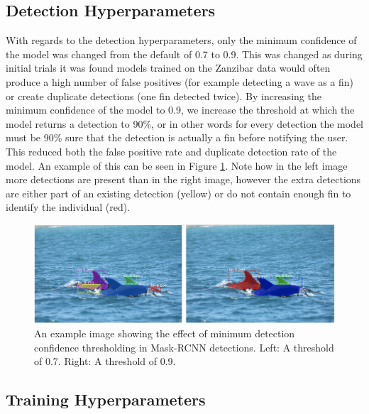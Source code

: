 \subsection{Detection Hyperparameters}\label{ch:cetDet,sec:ModelSelection,sub:DetectionHyperparameters}
 
 With regards to the detection hyperparameters, only the minimum confidence of the model was changed from the default of 0.7 to 0.9. This was changed as during initial trials it was found models trained on the Zanzibar data would often produce a high number of false positives (for example detecting a wave as a fin) or create duplicate detections (one fin detected twice). By increasing the minimum confidence of the model to 0.9, we increase the threshold at which the model returns a detection to 90\%, or in other words for every detection the model must be 90\% sure that the detection is actually a fin before notifying the user. This reduced both the false positive rate and duplicate detection rate of the model. An example of this can be seen in Figure \ref{fig:min-conf}. Note how in the left image more detections are present than in the right image, however the extra detections are either part of an existing detection (yellow) or do not contain enough fin to identify the individual (red).
 
\begin{figure}[h]
	\begin{center}
		\includegraphics[scale=0.55]{Chapter3/figs/min-conf-eg.png}
	\end{center}
	\caption{An example image showing the effect of minimum detection confidence thresholding in Mask-RCNN detections. Left: A threshold of 0.7. Right: A threshold of 0.9.}
	\label{fig:min-conf}
\end{figure}
 
 
\subsection{Training Hyperparameters}\label{ch:cetDet,sec:ModelSelection,sub:TrainingHyperparameters}

